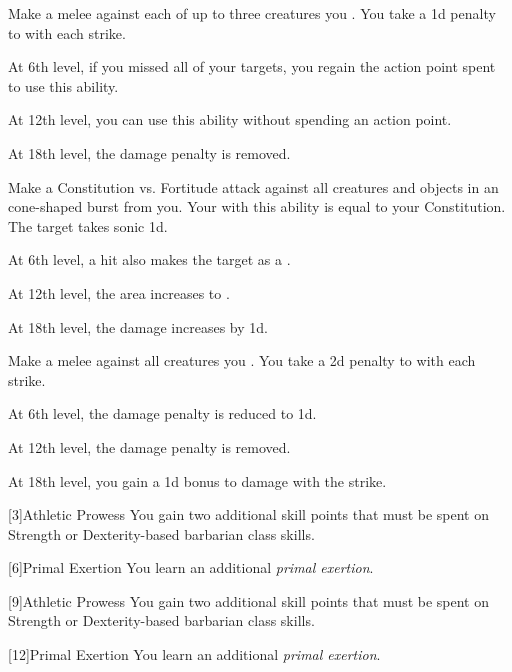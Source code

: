 {             Make a melee  against each of up to three creatures you .
            You take a \minus1d penalty to  with each strike.
            \par At 6th level, if you missed all of your targets, you regain the action point spent to use this ability.
            \par At 12th level, you can use this ability without spending an action point.
            \par At 18th level, the damage penalty is removed.

             Make a Constitution vs. Fortitude attack against all creatures and objects in an \areamed cone-shaped burst from you.
            Your  with this ability is equal to your Constitution.
             The target takes sonic  \minus1d.
            \par At 6th level, a hit also makes the target  as a .
            \par At 12th level, the area increases to \arealarge.
            \par At 18th level, the damage increases by \plus1d.

             Make a melee  against all creatures you .
            You take a \minus2d penalty to  with each strike.
            \par At 6th level, the damage penalty is reduced to \minus1d.
            \par At 12th level, the damage penalty is removed.
            \par At 18th level, you gain a \plus1d bonus to damage with the strike.
        }

        [3]{Athletic Prowess} You gain two additional skill points that must be spent on Strength or Dexterity-based barbarian class skills.

        [6]{Primal Exertion}
        You learn an additional \textit{primal exertion}.

        [9]{Athletic Prowess} You gain two additional skill points that must be spent on Strength or Dexterity-based barbarian class skills.

        [12]{Primal Exertion}
        You learn an additional \textit{primal exertion}.

